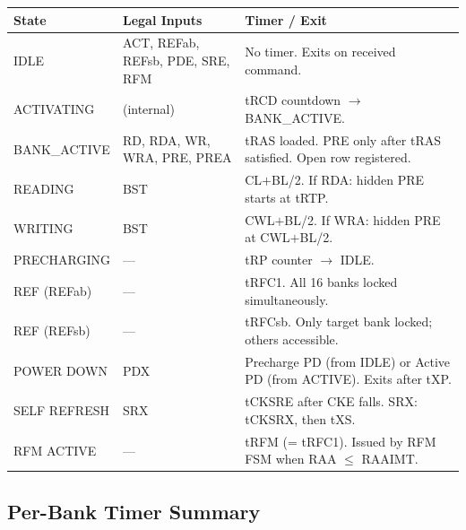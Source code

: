 \documentclass[10pt,a4paper]{article}
\newcommand{\Th}[1]{\cellcolor{thbg}\textbf{\small\color{acc1}#1}}
\newcommand{\RA}{\rowcolor{white}}
\newcommand{\RB}{\rowcolor{altbg}}
\begin{document}
\begin{center}
\begin{tabularx}{\linewidth}{@{} l l X @{}}
\toprule
\Th{State} & \Th{Legal Inputs} & \Th{Timer / Exit} \\
\midrule
\RA IDLE              & ACT, REFab, REFsb, PDE, SRE, RFM & No timer. Exits on received command. \\
\RB ACTIVATING        & (internal)                        & tRCD countdown $\to$ BANK\_ACTIVE. \\
\RA BANK\_ACTIVE      & RD, RDA, WR, WRA, PRE, PREA       & tRAS loaded. PRE only after tRAS satisfied. Open row registered. \\
\RB READING           & BST                               & CL$+$BL/2. If RDA: hidden PRE starts at tRTP. \\
\RA WRITING           & BST                               & CWL$+$BL/2. If WRA: hidden PRE at CWL$+$BL/2. \\
\RB PRECHARGING       & ---                               & tRP counter $\to$ IDLE. \\
\RA REF (REFab)       & ---                               & tRFC1. All 16 banks locked simultaneously. \\
\RB REF (REFsb)       & ---                               & tRFCsb. Only target bank locked; others accessible. \\
\RA POWER DOWN        & PDX                               & Precharge PD (from IDLE) or Active PD (from ACTIVE). Exits after tXP. \\
\RB SELF REFRESH      & SRX                               & tCKSRE after CKE falls. SRX: tCKSRX, then tXS. \\
\RA RFM ACTIVE        & ---                               & tRFM (= tRFC1). Issued by RFM FSM when RAA $\leq$ RAAIMT. \\
\bottomrule
\end{tabularx}
\end{center}

\subsection{Per-Bank Timer Summary}
\end{document}
